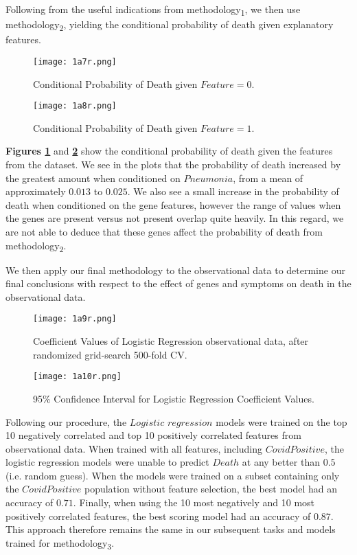 Following from the useful indications from methodology\textsubscript{1}, we then use methodology\textsubscript{2}, yielding the conditional probability of death given explanatory features.

\begin{figure}[H]
  \texttt{[image: 1a7r.png]}
  \caption{Conditional Probability of Death given $Feature = 0$.}
    \label{fig:1a7r}
\end{figure}

\begin{figure}[H]
  \texttt{[image: 1a8r.png]}
  \caption{Conditional Probability of Death given $Feature = 1$.}
    \label{fig:1a8r}
\end{figure}

\textbf{Figures \ref{fig:1a7r}} and \textbf{\ref{fig:1a8r}} show the conditional probability of death given the features from the dataset. We see in the plots that the probability of death increased by the greatest amount when conditioned on $Pneumonia$, from a mean of approximately $0.013$ to $0.025$. We also see a small increase in the probability of death when conditioned on the gene features, however the range of values when the genes are present versus not present overlap quite heavily. In this regard, we are not able to deduce that these genes affect the probability of death from methodology\textsubscript{2}.


We then apply our final methodology to the observational data to determine our final conclusions with respect to the effect of genes and symptoms on death in the observational data.

\begin{figure}[H]
  \texttt{[image: 1a9r.png]}
  \caption{Coefficient Values of Logistic Regression observational data, after randomized grid-search 500-fold CV.}
    \label{fig:1a9r}
\end{figure}

\begin{figure}[H]
  \texttt{[image: 1a10r.png]}
  \caption{95\%  Confidence  Interval  for  Logistic  Regression Coefficient Values.}
    \label{fig:1a10r}
\end{figure}

Following our procedure, the $Logistic$ $regression$ models were trained on the top 10 negatively correlated and top 10 positively correlated features from observational data. When trained with all features, including $CovidPositive$, the logistic regression models were unable to predict $Death$ at any better than $0.5$ (i.e. random guess). When the models were trained on a subset containing only the $CovidPositive$ population without feature selection, the best model had an accuracy of $0.71$. Finally, when using the 10 most negatively and 10 most positively correlated features, the best scoring model had an accuracy of $0.87$. This approach therefore remains the same in our subsequent tasks and models trained for methodology\textsubscript{3}.

